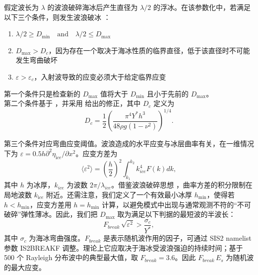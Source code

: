 假定波长为 $\lambda$ 的波浪破碎海冰后产生直径为 $\lambda / 2$ 的浮冰。在该参数化中，若满足以下三个条件，则发生波浪破冰 \citep{art:Wea13}：
\begin{enumerate}
\item $\lambda/2 \geq D_{\min} \quad \mathrm{and} \quad  \lambda/2 \leq D_{\max}$
\item $D_{\max}>D_c$，因为存在一个取决于海冰性质的临界直径，低于该直径时不可能发生弯曲破坏
\item $\varepsilon>\varepsilon_c$，入射波导致的应变必须大于给定临界应变
\end{enumerate}
第一个条件只是检查新的 $D_{\max}$ 值将大于 $D_{\min}$ 且小于先前的 $D_{\max}$。\\

第二个条件基于 \cite{inc:M86}，并采用 \cite{art:Bea18} 给出的修正，其中 $D_{c}$ 定义为
\begin{equation}
D_{c}=\dfrac{1}{2}\left(\frac{\pi^4 Y^* h^3}{48 \rho g (1 -\nu ^2)}\right)^{1/4}. 
\end{equation}

第三个条件对应弯曲应变阈值。波浪造成的水平应变与冰层曲率有关，在一维情况下为 $\varepsilon = 0.5 h \partial ^2 \eta_{\mathrm ice} / \partial x^2$。应变方差为
\begin{equation}
\langle\varepsilon^2\rangle = \left( \frac{h}{2} \right) ^2   \int_{k_1}^{k_2} k_{ice}^4 F(k)dk ,
\label{strain_sign}
\end{equation}
其中 $h$ 为冰厚，$k_{ice}$ 为波数 $2 \pi /\lambda_{ice}$。借鉴波浪破碎思想 \citep{art:BBY00}，曲率方差的积分限制在局地波数 $k_{\mathrm ice}$ 附近。还需注意，我们定义了一个有效最小冰厚 $h_{\min}$，使得若 $h<h_{\min}$，应变方差用 $h=h_{\min}$ 计算，以避免模式中出现与通常观测不符的“不可破碎”弹性薄冰。因此，我们把 $D_{\max}$ 取为满足以下判据的最短波的半波长：
\begin{equation}
F_{break}\, \sqrt{\varepsilon^2} > \frac{\sigma_c}{Y^*} ,
\label{strain_crit}
\end{equation}
其中 $\sigma_c$ 为海冰弯曲强度。$F_{break}$ 是表示随机波作用的因子，可通过 {\F SIS2} namelist 参数 {\code IS2BREAKF} 调整。理论上它应取决于海冰受波浪强迫的持续时间；基于 500 个 Rayleigh 分布波中的典型最大值，取 $F_{break}=3.6$。因此 $F_{break} \, E_s$ 为随机波的最大应变。\\




